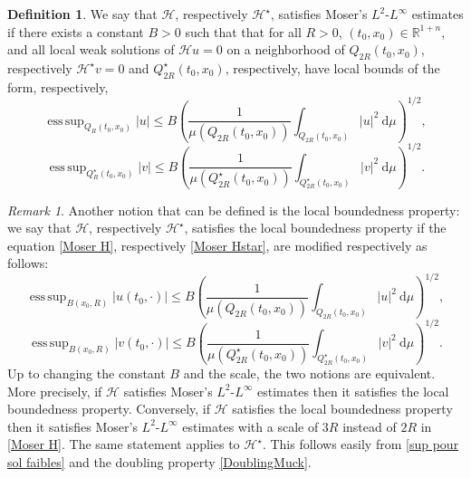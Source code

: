 \documentclass[12pt, letterpaper]{amsart}
\theoremstyle{definition}
\newtheorem{defn}[thm]{Definition}
\theoremstyle{remark}
\newtheorem{rem}[thm]{Remark}
\numberwithin{equation}{section}
\DeclareMathOperator*{\supess}{ess\,sup}
\begin{document}
\begin{defn}\label{def:Moser}
    We say that $\mathcal{H}$, respectively $\mathcal{H}^\star$, satisfies Moser’s $L^2$-$L^\infty$ estimates if there exists a constant $B>0$ such that that for all $R>0$, $(t_0,x_0) \in \mathbb{R}^{1+n}$, and all local weak solutions of $\mathcal{H}u=0$ on a neighborhood of $Q_{2R}(t_0,x_0)$, respectively $\mathcal{H}^\star v=0$ and $Q_{2R}^\star(t_0,x_0)$, respectively, have local bounds of the form, respectively,
    \begin{equation}\label{Moser H}
        \supess_{Q_{R}(t_0,x_0)} \left | u \right | \leq B \left ( \frac{1}{\mu(Q_{2R}(t_0,x_0))} \int_{Q_{2R}(t_0,x_0)} \left | u \right |^2 \ \mathrm d\mu\right  )^{1/2},
    \end{equation}
    \begin{equation}\label{Moser Hstar}
        \supess_{Q_{R}^\star(t_0,x_0)} \left | v \right | \leq B \left ( \frac{1}{\mu(Q_{2R}^\star(t_0,x_0))} \int_{Q_{2R}^\star(t_0,x_0)} \left | v \right |^2 \ \mathrm d\mu\right  )^{1/2}.
    \end{equation}
\end{defn}
\begin{rem}
Another notion that can be defined is the local boundedness property: we say that $\mathcal{H}$, respectively $\mathcal{H}^\star$, satisfies the local boundedness property if the equation \eqref{Moser H}, respectively \eqref{Moser Hstar}, are modified respectively as follows:
    \begin{equation}\label{LBP H}
        \supess_{B(x_0, R)} |u(t_0, \cdot)| \leq B \left ( \frac{1}{\mu(Q_{2R}(t_0,x_0))} \int_{Q_{2R}(t_0,x_0)} \left | u \right |^2 \ \mathrm d\mu\right  )^{1/2},
    \end{equation}
    \begin{equation}\label{LBP Hstar}
        \supess_{B(x_0, R)} |v(t_0, \cdot)| \leq B \left ( \frac{1}{\mu(Q_{2R}^\star(t_0,x_0))} \int_{Q_{2R}^\star(t_0,x_0)} \left | v \right |^2 \ \mathrm d\mu\right  )^{1/2}.
    \end{equation}
Up to changing the constant $B$ and the scale, the two notions are equivalent. More precisely, if $\mathcal{H}$ satisfies Moser’s $L^2$-$L^\infty$ estimates then it satisfies the local boundedness property. Conversely, if $\mathcal{H}$ satisfies the local boundedness property then it satisfies Moser’s $L^2$-$L^\infty$ estimates with a scale of $3R$ instead of $2R$ in \eqref{Moser H}. The same statement applies to $\mathcal{H}^\star$. This follows easily from \eqref{sup pour sol faibles} and the doubling property \eqref{DoublingMuck}.
\end{rem}
\end{document}
